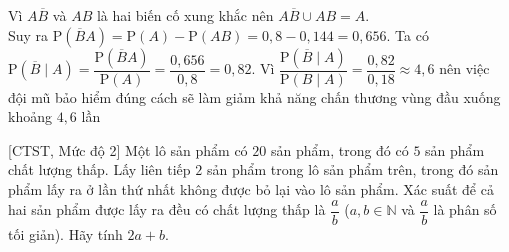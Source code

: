 \begin{ex}
{\begin{itemchoice}
			\itemch Vì $A\overline{B}$ và $AB$ là hai biến cố xung khắc nên $A\overline{B}\cup AB=A$.\\
			Suy ra $\mathrm{P}\left(\overline{B}A\right)=\mathrm{P}(A)-\mathrm{P}(AB)=0{,}8-0{,}144=0{,}656$.
			\itemch Ta có  $\mathrm{P}\left(\overline{B}\mid A\right)=\dfrac{\mathrm{P}\left(\overline{B}A\right)}{\mathrm{P}(A)}=\dfrac{0{,}656}{0{,}8}=0{,}82$.
			\itemch Vì $\dfrac{\mathrm{P}\left(\overline{B}\mid A\right)}{\mathrm{P}(B\mid A)}=\dfrac{0{,}82}{0{,18}}\approx 4{,}6$ nên việc đội mũ bảo hiểm đúng cách sẽ làm giảm khả năng chấn thương vùng đầu xuống khoảng $4{,}6$ lần
		\end{itemchoice}
	}
\end{ex}

\begin{bt}%
[CTST, Mức độ 2]%
	Một lô sản phẩm có $20$ sản phẩm, trong đó có $5$ sản phẩm chất lượng thấp. Lấy liên tiếp $2$ sản phẩm trong lô sản phẩm trên, trong đó sản phẩm lấy ra ở lần thứ nhất không được bỏ lại vào lô sản phẩm. Xác suất để cả hai sản phẩm được lấy ra đều có chất lượng thấp là $\dfrac{a}{b}$  ($a,b \in \mathbb{N}$ và $\dfrac{a}{b}$ là phân số tối giản). Hãy tính $2a+b$.
\end{bt}

